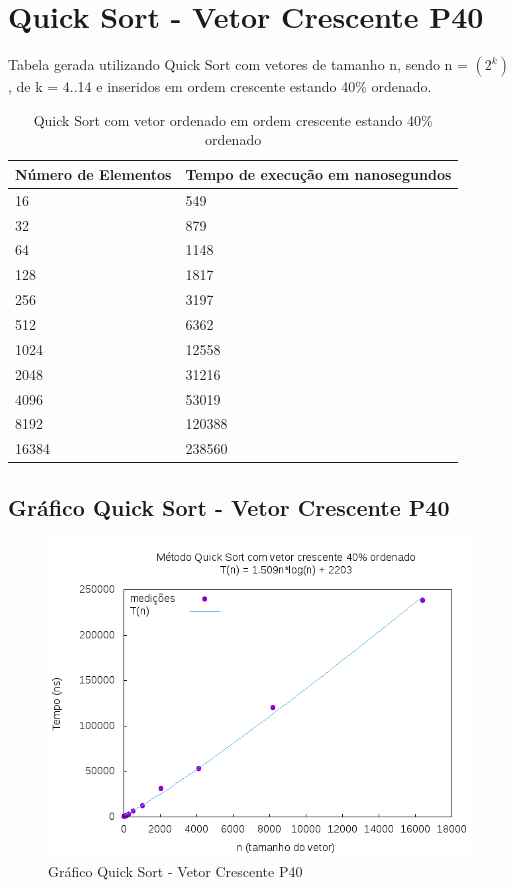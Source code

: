 \documentclass[12pt,a4paper,twoside]{report}
\begin{document}
\section{Quick Sort - Vetor Crescente P40}
Tabela gerada utilizando Quick Sort com vetores de tamanho n, sendo n = $(2^k)$, de k = 4..14 e inseridos em ordem crescente estando 40\% ordenado.
\begin{table}[H]
\centering
\caption{Quick Sort com vetor ordenado em ordem crescente estando 40\% ordenado}
\label{my-label}
\begin{tabular}{|l|l|}
\hline
\multicolumn{1}{|c|}{\textbf{Número de Elementos}} & \multicolumn{1}{c|}{\textbf{Tempo de execução em nanosegundos}} \\ \hline
16 & 549 \\ \hline
32 & 879 \\ \hline
64 & 1148 \\ \hline
128 & 1817 \\ \hline
256 & 3197 \\ \hline
512 & 6362 \\ \hline
1024 & 12558 \\ \hline
2048 & 31216 \\ \hline
4096 & 53019 \\ \hline
8192 & 120388 \\ \hline
16384 & 238560 \\ \hline
\end{tabular}
\end{table}

\subsection{Gráfico Quick Sort - Vetor Crescente P40}
\begin{figure}[H]
    \centering
    \includegraphics[width=0.7\linewidth]{graficos/QuickSort/vIntCrescenteP40/vIntCrescenteP40.png}
  \caption{Gráfico Quick Sort - Vetor Crescente P40}
\end{figure}
\end{document}
